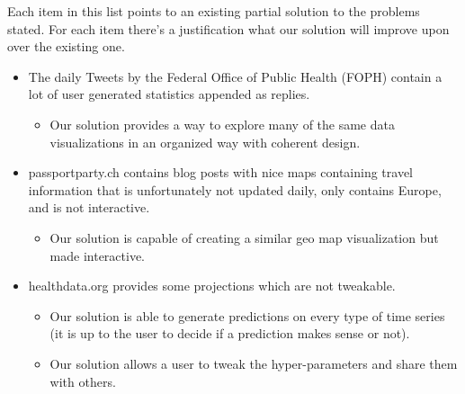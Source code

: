 Each item in this list points to an existing partial solution to the problems stated. For each item there's a justification what our solution will improve upon over the existing one.

\begin{itemize}
    \item The daily Tweets by the Federal Office of Public Health (FOPH) contain a lot of user generated statistics appended as replies.
    \begin{itemize}
        \item Our solution provides a way to explore many of the same data visualizations in an organized way with coherent design.
    \end{itemize}
    \item passportparty.ch contains blog posts with nice maps containing travel information that is unfortunately not updated daily, only contains Europe, and is not interactive.
    \begin{itemize}
        \item Our solution is capable of creating a similar geo map visualization but made interactive.
    \end{itemize}
    \item healthdata.org provides some projections which are not tweakable.
    \begin{itemize}
        \item Our solution is able to generate predictions on every type of time series (it is up to the user to decide if a prediction makes sense or not).
        \item Our solution allows a user to tweak the hyper-parameters and share them with others.
    \end{itemize}
\end{itemize}
